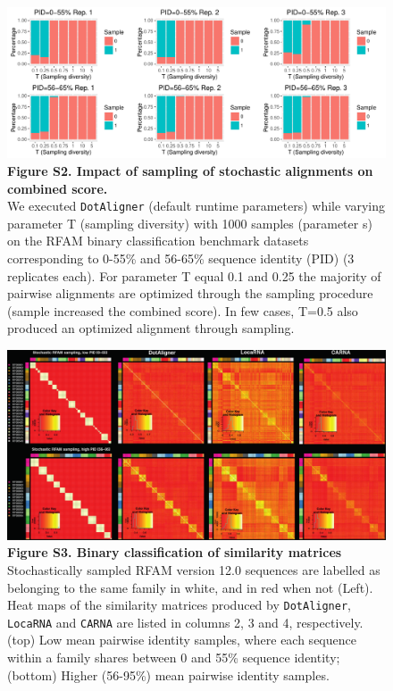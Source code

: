 \documentclass{bmcart}
\newcommand\dotaligner{\texttt{DotAligner}}
\newcommand\locarna{\texttt{LocaRNA}}
\newcommand\carna{\texttt{CARNA}}
\begin{document}
\begin{figure}
 \includegraphics[width=\textwidth]{SF2}
 \caption*{ \textbf{ Figure S2. Impact of sampling of stochastic alignments on combined score.}\\
 We executed \dotaligner{} (default runtime parameters) while varying parameter T (sampling diversity) with 1000 samples (parameter s) on the RFAM binary classification benchmark datasets corresponding to 0-55\% and 56-65\% sequence identity (PID) (3 replicates each). For parameter T equal 0.1 and 0.25 the majority of pairwise alignments are optimized through the sampling procedure (sample increased the combined score). In few cases, T=0.5 also produced an optimized alignment through sampling. 
}
\end{figure}

\begin{figure}
    \includegraphics[width=\textwidth]{SF3}
     \caption*{ \textbf{ Figure S3. Binary classification of similarity matrices  }\\
Stochastically sampled RFAM version 12.0 sequences are labelled as belonging to the same family in white, and in red when not (Left). Heat maps of the similarity matrices produced by \dotaligner{}, \locarna{} and \carna{} are listed in columns 2, 3 and 4, respectively.  
(top) Low mean pairwise identity samples, where each sequence within 
a family shares between 0 and 55\% sequence identity; (bottom) Higher (56-95\%) mean pairwise identity samples. }
\end{figure}
\end{document}
